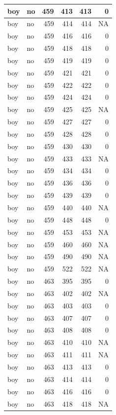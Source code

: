 \documentclass[man]{apa6}
\begin{document}
\begin{tabular}{l|l|r|r|r|r}
\hline
boy & no & 459 & 413 & 413 & 0\\
\hline
boy & no & 459 & 414 & 414 & NA\\
\hline
boy & no & 459 & 416 & 416 & 0\\
\hline
boy & no & 459 & 418 & 418 & 0\\
\hline
boy & no & 459 & 419 & 419 & 0\\
\hline
boy & no & 459 & 421 & 421 & 0\\
\hline
boy & no & 459 & 422 & 422 & 0\\
\hline
boy & no & 459 & 424 & 424 & 0\\
\hline
boy & no & 459 & 425 & 425 & NA\\
\hline
boy & no & 459 & 427 & 427 & 0\\
\hline
boy & no & 459 & 428 & 428 & 0\\
\hline
boy & no & 459 & 430 & 430 & 0\\
\hline
boy & no & 459 & 433 & 433 & NA\\
\hline
boy & no & 459 & 434 & 434 & 0\\
\hline
boy & no & 459 & 436 & 436 & 0\\
\hline
boy & no & 459 & 439 & 439 & 0\\
\hline
boy & no & 459 & 440 & 440 & NA\\
\hline
boy & no & 459 & 448 & 448 & 0\\
\hline
boy & no & 459 & 453 & 453 & NA\\
\hline
boy & no & 459 & 460 & 460 & NA\\
\hline
boy & no & 459 & 490 & 490 & NA\\
\hline
boy & no & 459 & 522 & 522 & NA\\
\hline
boy & no & 463 & 395 & 395 & 0\\
\hline
boy & no & 463 & 402 & 402 & NA\\
\hline
boy & no & 463 & 403 & 403 & 0\\
\hline
boy & no & 463 & 407 & 407 & 0\\
\hline
boy & no & 463 & 408 & 408 & 0\\
\hline
boy & no & 463 & 410 & 410 & NA\\
\hline
boy & no & 463 & 411 & 411 & NA\\
\hline
boy & no & 463 & 413 & 413 & 0\\
\hline
boy & no & 463 & 414 & 414 & 0\\
\hline
boy & no & 463 & 416 & 416 & 0\\
\hline
boy & no & 463 & 418 & 418 & NA\\

\end{tabular}
\end{document}
